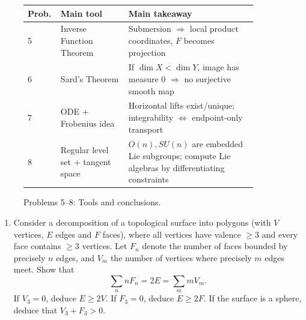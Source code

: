 \begin{solution}
\begin{figure}[htbp]
	\centering
	\renewcommand{\arraystretch}{1.35}
	\begin{tabular}{|p{0.08\linewidth}|p{0.29\linewidth}|p{0.53\linewidth}|}
		\hline
		\textbf{Prob.} & \textbf{Main tool} & \textbf{Main takeaway} \\
		\hline
		5 & Inverse Function Theorem & Submersion $\Rightarrow$ local product coordinates, $F$ becomes projection \\
		\hline
		6 & Sard's Theorem & If $\dim X<\dim Y$, image has measure $0$ $\Rightarrow$ no surjective smooth map \\
		\hline
		7 & ODE + Frobenius idea & Horizontal lifts exist/unique; integrability $\Leftrightarrow$ endpoint-only transport \\
		\hline
		8 & Regular level set + tangent space & $O(n),SU(n)$ are embedded Lie subgroups; compute Lie algebras by differentiating constraints \\
		\hline
	\end{tabular}
	\caption{Problems 5--8: Tools and conclusions.}
\end{figure}
\end{solution}

\begin{problem}
\label{prob:cp-vii-0023}
\begin{enumerate}[label=\textnormal{(\alph*)}]
	
	\item 
	Consider a decomposition of a topological surface into polygons
	(with $V$ vertices, $E$ edges and $F$ faces), where all vertices
	have valence $\ge 3$ and every face contains $\ge 3$ vertices.
	Let $F_{n}$ denote the number of faces bounded by precisely $n$ edges,
	and $V_{m}$ the number of vertices where precisely $m$ edges meet.
	Show that
	\[
	\sum_{n} n F_{n} = 2E = \sum_{m} m V_{m}.
	\]
	If $V_{3} = 0$, deduce $E \ge 2V$.
	If $F_{3} = 0$, deduce $E \ge 2F$.
	If the surface is a sphere, deduce that $V_{3} + F_{3} > 0$.
	
	\medskip

\end{enumerate}\end{problem}

